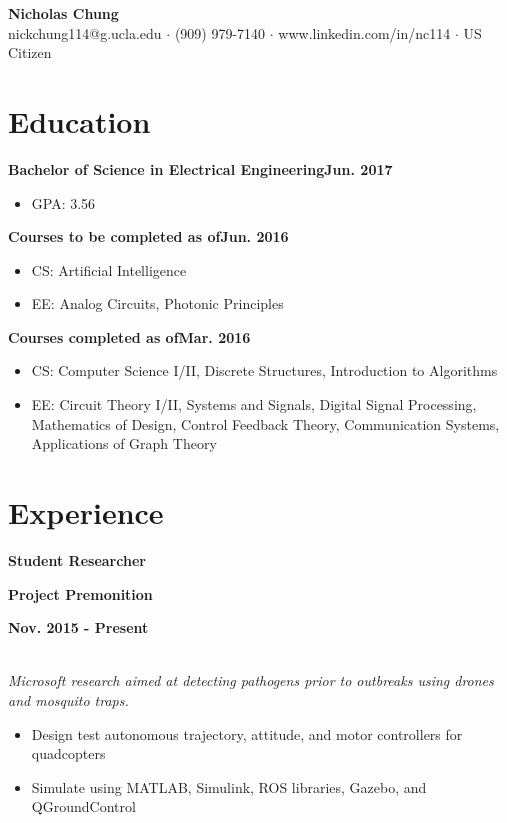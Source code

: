 \documentclass[12pt]{article}
\newcommand\textbox[1]{\parbox{.333\textwidth}{#1}}
\newcommand{\textlcr}[3]{\textbox{\textbf{#1}\hfill}\textbox{\hfil \textbf{#2}\hfil}\textbox{\hfill \textbf{#3}}}
\begin{document}
\begin{center}
	\textbf{\LARGE Nicholas Chung} \\ \vspace{.5ex}
	nickchung114@g.ucla.edu $\cdot$ (909) 979-7140 $\cdot$ www.linkedin.com/in/nc114 $\cdot$ US Citizen
\end{center}

\vspace{-8pt}
\smallskip
\section*{Education}
\vspace*{-1em}\makebox[\linewidth]{\rule{\textwidth}{0.4pt}}

\textbf{Bachelor of Science in Electrical Engineering}\hfill\textbf{Jun. 2017}
\begin{itemize}
\item GPA: 3.56
\end{itemize}

\textbf{Courses to be completed as of}\hfill\textbf{Jun. 2016}
\begin{itemize}
\item CS: Artificial Intelligence
\item EE: Analog Circuits, Photonic Principles
\end{itemize}

\textbf{Courses completed as of}\hfill\textbf{Mar. 2016}
\begin{itemize}
\item CS: Computer Science I/II, Discrete Structures, Introduction to Algorithms
\item EE: Circuit Theory I/II, Systems and Signals, Digital Signal Processing, Mathematics of Design, Control Feedback Theory, Communication Systems, Applications of Graph Theory
\end{itemize}

\section*{Experience}
\vspace*{-1em}\makebox[\linewidth]{\rule{\textwidth}{0.4pt}}

\textlcr{Student Researcher}{Project Premonition}{Nov. 2015 - Present} \\
\textit{Microsoft research aimed at detecting pathogens prior to outbreaks using drones and mosquito traps.}
\begin{itemize}
\item Design test autonomous trajectory, attitude, and motor controllers for quadcopters
\item Simulate using MATLAB, Simulink, ROS libraries, Gazebo, and QGroundControl
\end{itemize}
\end{document}
